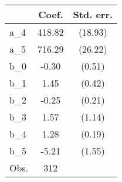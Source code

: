 {
\def\sym#1{\ifmmode^{#1}\else\(^{#1}\)\fi}
\begin{tabular}{l*{1}{cc}}
\hline\hline
                &    Coef.&Std. err.\\
\hline
a\_4             &   418.82&  (18.93)\\
a\_5             &   716.29&  (26.22)\\
b\_0             &    -0.30&   (0.51)\\
b\_1             &     1.45&   (0.42)\\
b\_2             &    -0.25&   (0.21)\\
b\_3             &     1.57&   (1.14)\\
b\_4             &     1.28&   (0.19)\\
b\_5             &    -5.21&   (1.55)\\
\hline
Obs.            &      312&         \\
\hline\hline
\end{tabular}
}
